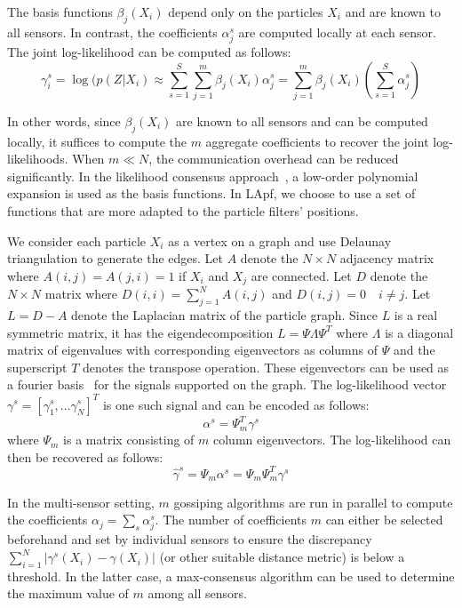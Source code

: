 \documentclass[10pt,letterpaper,final]{article}
\begin{document}
The basis functions $\beta_j(X_i)$ depend only on the particles $X_i$ and are known to all sensors. In contrast, the coefficients $\alpha_j^s$ are computed locally at each sensor. The joint log-likelihood can be computed as follows:
\begin{equation}
\gamma_i^s = \log (p(Z|X_i) \approx \sum_{s=1}^S \sum_{j=1}^m \beta_j(X_i)\alpha_j^s = \sum_{j=1}^m \beta_j(X_i)\left(\sum_{s=1}^S\alpha_j^s\right)
\end{equation}

In other words, since $\beta_j(X_i)$ are known to all sensors and can be computed locally, it suffices to compute the $m$ aggregate coefficients to recover the joint log-likelihoods. When $m\ll N$, the communication overhead can be reduced significantly. In the likelihood consensus approach~\cite{Hlinka2012}, a low-order polynomial expansion is used as the basis functions. In LApf, we choose to use a set of functions that are more adapted to the particle filters' positions. 

We consider each particle $X_i$ as a vertex on a graph and use Delaunay triangulation to generate the edges. Let $A$ denote the $N\times N$ adjacency matrix where $A(i,j)=A(j,i)=1$ if $X_i$ and $X_j$ are connected. Let $D$ denote the $N\times N$ matrix where $D(i,i)=\sum_{j=1}^N A(i,j)$ and $D(i,j)=0\quad i \neq j$. Let $L=D-A$ denote the Laplacian matrix of the particle graph. Since $L$ is a real symmetric matrix, it has the eigendecomposition $L=\Psi \Lambda \Psi^T$ where $\Lambda$ is a diagonal matrix of eigenvalues with corresponding eigenvectors as columns of $\Psi$ and the superscript $T$ denotes the transpose operation. These eigenvectors can be used as a fourier basis~\cite{Zhu2012} for the signals supported on the graph. The log-likelihood vector $\gamma^s = \left[\gamma_1^s,...\gamma_N^s \right]^T$ is one such signal and can be encoded as follows:
\begin{equation}
\alpha^s = \Psi_m^T \gamma^s
\end{equation}
where $\Psi_m$ is a matrix consisting of $m$ column eigenvectors. The log-likelihood can then be recovered as follows:
\begin{equation}
\hat{\gamma}^s = \Psi_m \alpha^s = \Psi_m\Psi_m^T\gamma^s
\end{equation}

In the multi-sensor setting, $m$ gossiping algorithms are run in parallel to compute the coefficients $\alpha_j=\sum_s \alpha_j^s$. The number of coefficients $m$ can either be selected beforehand and set by individual sensors to ensure the discrepancy $\sum_{i=1}^N|\gamma^s(X_i)-\gamma(X_i)|$ (or other suitable distance metric) is below a threshold. In the latter case, a max-consensus algorithm can be used to determine the maximum value of $m$ among all sensors. 
\end{document}
